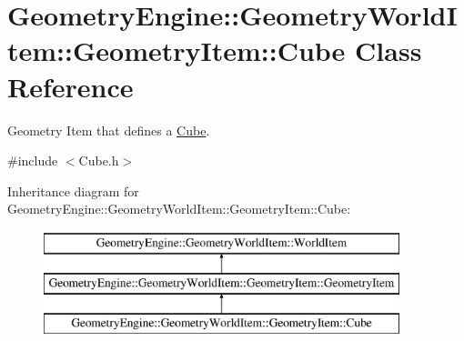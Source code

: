 \hypertarget{class_geometry_engine_1_1_geometry_world_item_1_1_geometry_item_1_1_cube}{}\section{Geometry\+Engine\+::Geometry\+World\+Item\+::Geometry\+Item\+::Cube Class Reference}
\label{class_geometry_engine_1_1_geometry_world_item_1_1_geometry_item_1_1_cube}


Geometry Item that defines a \mbox{\hyperlink{class_geometry_engine_1_1_geometry_world_item_1_1_geometry_item_1_1_cube}{Cube}}.  




{\ttfamily \#include $<$Cube.\+h$>$}

Inheritance diagram for Geometry\+Engine\+::Geometry\+World\+Item\+::Geometry\+Item\+::Cube\+:\begin{figure}[H]
\begin{center}
\leavevmode
\includegraphics[height=3.000000cm]{class_geometry_engine_1_1_geometry_world_item_1_1_geometry_item_1_1_cube}
\end{center}
\end{figure}
